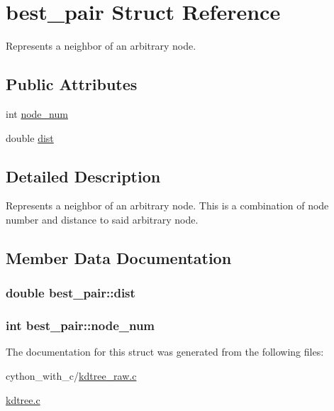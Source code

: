 \hypertarget{structbest__pair}{
\section{best\_\-pair Struct Reference}
\label{structbest__pair}
}


Represents a neighbor of an arbitrary node.  


\subsection*{Public Attributes}
\begin{DoxyCompactItemize}
\item 
int \hyperlink{structbest__pair_a8fda66803ec6bf1ea5778c416aaa5a33}{node\_\-num}
\item 
double \hyperlink{structbest__pair_ab5c7c4e2ec7508134f050138398eff17}{dist}
\end{DoxyCompactItemize}


\subsection{Detailed Description}
Represents a neighbor of an arbitrary node. This is a combination of node number and distance to said arbitrary node. 

\subsection{Member Data Documentation}
\hypertarget{structbest__pair_ab5c7c4e2ec7508134f050138398eff17}{
\subsubsection[{dist}]{\setlength{\rightskip}{0pt plus 5cm}double {\bf best\_\-pair::dist}}}
\label{structbest__pair_ab5c7c4e2ec7508134f050138398eff17}
\hypertarget{structbest__pair_a8fda66803ec6bf1ea5778c416aaa5a33}{
\subsubsection[{node\_\-num}]{\setlength{\rightskip}{0pt plus 5cm}int {\bf best\_\-pair::node\_\-num}}}
\label{structbest__pair_a8fda66803ec6bf1ea5778c416aaa5a33}


The documentation for this struct was generated from the following files:\begin{DoxyCompactItemize}
\item 
cython\_\-with\_\-c/\hyperlink{kdtree__raw_8c}{kdtree\_\-raw.c}\item 
\hyperlink{kdtree_8c}{kdtree.c}\end{DoxyCompactItemize}
